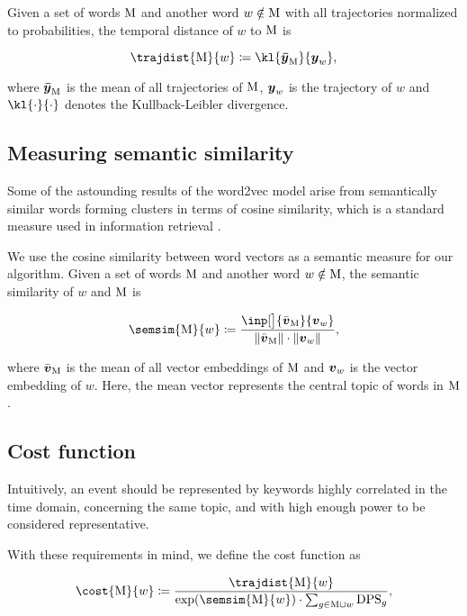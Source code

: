 Given a set of words $\text{M}$ and another word $w \notin \text{M}$ with all trajectories normalized to probabilities, the temporal distance of $w$ to $\text{M}$ is

\begin{equation}
	\trajdist{\featset}{w} \coloneqq \kl{\vect{\bar{\traj}}_{\featset}}{\vect{\traj}_{w}},
\end{equation}

where $\vect{\bar{\traj}}_{\featset}$ is the mean of all trajectories of $\text{M}$, $\vect{\traj}_{w}$ is the trajectory of $w$ and $\kl{\cdot}{\cdot}$ denotes the Kullback-Leibler divergence.


\subsection{Measuring semantic similarity}
Some of the astounding results of the word2vec model arise from semantically similar words forming clusters \cite{linguistic-regularities} in terms of cosine similarity, which is a standard measure used in information retrieval \cite{information-retrieval, cosine-similarity}.

We use the cosine similarity between word vectors as a semantic measure for our algorithm. Given a set of words $\text{M}$ and another word $w \notin \text{M}$, the semantic similarity of $w$ and $\text{M}$ is

\begin{equation}
	\semsim{\featset}{w} \coloneqq \frac{\inp[\big]{\bar{\embed}_{\featset}}{\embed_{w}}}{\| \bar{\embed}_{\featset} \| \cdot \| \embed_{w} \|},
\end{equation}

where $\bar{\embed}_{\featset}$ is the mean of all vector embeddings of $\text{M}$ and $\embed_{w}$ is the vector embedding of $w$. Here, the mean vector represents the central topic of words in $\text{M}$.


\subsection{Cost function}
Intuitively, an event should be represented by keywords highly correlated in the time domain, concerning the same topic, and with high enough power to be considered representative.

With these requirements in mind, we define the cost function as

\begin{equation} \label{eq:cost-function}
	\cost{\featset}{w} \coloneqq \frac{\trajdist{\featset}{w}}{\exp(\semsim{\featset}{w}) \cdot \sum_{g \in \featset \cup w}{\text{DPS}_{g}}},
\end{equation}


